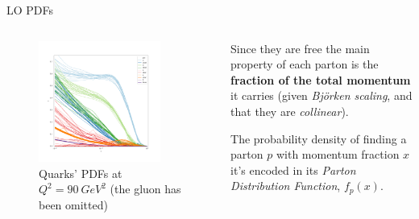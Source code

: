\documentclass[8pt]{beamer}
\begin{document}
\begin{frame}{LO PDFs}
    \begin{columns}
        \begin{column}{0.5\textwidth}
            \vspace*{-20pt}
            \begin{figure}
                \centering
                \includegraphics[width=0.85\textwidth]{pictures/lo_pdfs}
                \vspace*{-15pt}
                \caption{Quarks' PDFs at $Q^2 = \SI{90}{GeV^2}$ (the gluon
                has been omitted)}
            \end{figure}
        \end{column} 
        \begin{column}{0.5\textwidth}
            Since they are free the main property of each parton is the
            \textbf{fraction of the total momentum} it carries (given
            \textit{Björken scaling}, and that they are
            \textit{collinear}).\newline

            The probability density of finding a parton $p$ with momentum
            fraction $x$ it's encoded in its \textit{Parton Distribution Function},
            $f_p(x)$.
        \end{column}
    \end{columns} 
\end{frame}
\end{document}
